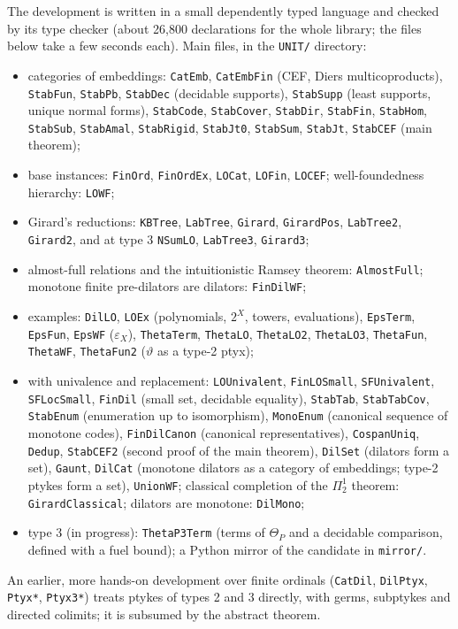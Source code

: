 \documentclass[11pt]{article}
\theoremstyle{definition}
\theoremstyle{remark}
\begin{document}
The development is written in a small dependently typed language and
checked by its type checker (about 26{,}800 declarations for the whole
library; the files below take a few seconds each). Main files, in the
\texttt{UNIT/} directory:
\begin{itemize}
\item categories of embeddings: \texttt{CatEmb}, \texttt{CatEmbFin} (CEF,
  Diers multicoproducts), \texttt{StabFun}, \texttt{StabPb},
  \texttt{StabDec} (decidable supports), \texttt{StabSupp} (least supports,
  unique normal forms), \texttt{StabCode}, \texttt{StabCover},
  \texttt{StabDir}, \texttt{StabFin}, \texttt{StabHom}, \texttt{StabSub},
  \texttt{StabAmal}, \texttt{StabRigid}, \texttt{StabJt0},
  \texttt{StabSum}, \texttt{StabJt}, \texttt{StabCEF} (main theorem);
\item base instances: \texttt{FinOrd}, \texttt{FinOrdEx},
  \texttt{LOCat}, \texttt{LOFin}, \texttt{LOCEF};
  well-foundedness hierarchy: \texttt{LOWF};
\item Girard's reductions: \texttt{KBTree}, \texttt{LabTree},
  \texttt{Girard}, \texttt{GirardPos}, \texttt{LabTree2}, \texttt{Girard2},
  and at type 3 \texttt{NSumLO}, \texttt{LabTree3}, \texttt{Girard3};
\item almost-full relations and the intuitionistic Ramsey theorem:
  \texttt{AlmostFull}; monotone finite pre-dilators are dilators:
  \texttt{FinDilWF};
\item examples: \texttt{DilLO}, \texttt{LOEx} (polynomials, $2^X$,
  towers, evaluations), \texttt{EpsTerm}, \texttt{EpsFun}, \texttt{EpsWF}
  ($\varepsilon_X$), \texttt{ThetaTerm}, \texttt{ThetaLO},
  \texttt{ThetaLO2}, \texttt{ThetaLO3}, \texttt{ThetaFun},
  \texttt{ThetaWF}, \texttt{ThetaFun2} ($\vartheta$ as a type-2 ptyx);
\item with univalence and replacement: \texttt{LOUnivalent},
  \texttt{FinLOSmall}, \texttt{SFUnivalent}, \texttt{SFLocSmall},
  \texttt{FinDil} (small set, decidable equality), \texttt{StabTab},
  \texttt{StabTabCov}, \texttt{StabEnum} (enumeration up to isomorphism),
  \texttt{MonoEnum} (canonical sequence of monotone codes),
  \texttt{FinDilCanon} (canonical representatives), \texttt{CospanUniq},
  \texttt{Dedup}, \texttt{StabCEF2} (second proof of the main theorem),
  \texttt{DilSet} (dilators form a set), \texttt{Gaunt}, \texttt{DilCat}
  (monotone dilators as a category of embeddings; type-2 ptykes form a set),
  \texttt{UnionWF}; classical completion of the $\Pi^1_2$ theorem:
  \texttt{GirardClassical}; dilators are monotone: \texttt{DilMono};
\item type 3 (in progress): \texttt{ThetaP3Term} (terms of $\Theta_P$ and a
  decidable comparison, defined with a fuel bound); a Python mirror of the candidate in
  \texttt{mirror/}.
\end{itemize}
An earlier, more hands-on development over finite ordinals
(\texttt{CatDil}, \texttt{DilPtyx}, \texttt{Ptyx*}, \texttt{Ptyx3*}) treats
ptykes of types 2 and 3 directly, with germs, subptykes and directed
colimits; it is subsumed by the abstract theorem.
\end{document}

